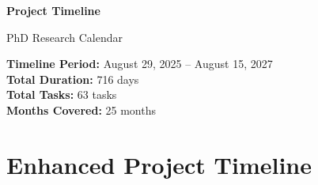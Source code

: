 \documentclass[landscape,a4paper]{article}
\begin{document}
\begin{titlepage}
\centering
\vspace*{1cm}

{\LARGE\textbf{Project Timeline}}

\vspace{0.5cm}
{\large PhD Research Calendar}

\vspace{1cm}

\begin{minipage}{0.9\textwidth}
\centering
\textbf{Timeline Period:} August 29, 2025 -- August 15, 2027\\
\textbf{Total Duration:} 716 days\\
\textbf{Total Tasks:} 63 tasks\\
\textbf{Months Covered:} 25 months
\end{minipage}

\vfill

\end{titlepage}
\newpage
\section*{Enhanced Project Timeline}
\end{document}
